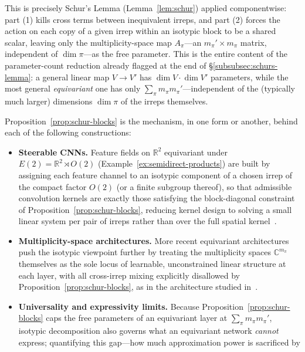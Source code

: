 \documentclass[mathematics,review,submit,moreauthors]{Definitions/mdpi}
\begin{document}
This is precisely Schur's Lemma (Lemma~\ref{lem:schur}) applied
componentwise: part (1) kills cross terms between inequivalent irreps, and
part (2) forces the action on each copy of a given irrep within an isotypic
block to be a shared scalar, leaving only the multiplicity-space map
$A_\pi$---an $m_\pi' \times m_\pi$ matrix, independent of $\dim \pi$---as the
free parameter. This is the entire content of the parameter-count reduction
already flagged at the end of \S\ref{subsubsec:schurs-lemma}: a general
linear map $V \to V'$ has $\dim V \cdot \dim V'$ parameters, while the most
general \emph{equivariant} one has only
$\sum_\pi m_\pi m_\pi'$---independent of the (typically much larger)
dimensions $\dim \pi$ of the irreps themselves.

\begin{Example}
\label{ex:isotypic-architecture}
Proposition~\ref{prop:schur-blocks} is the mechanism, in one form or
another, behind each of the following constructions:
\begin{itemize}
    \item \textbf{Steerable CNNs.} Feature fields on $\mathbb{R}^2$
    equivariant under $E(2) = \mathbb{R}^2 \rtimes O(2)$
    (Example~\ref{ex:semidirect-products}) are built by assigning each
    feature channel to an isotypic component of a chosen irrep of the
    compact factor $O(2)$ (or a finite subgroup thereof), so that admissible
    convolution kernels are exactly those satisfying the block-diagonal
    constraint of Proposition~\ref{prop:schur-blocks}, reducing kernel
    design to solving a small linear system per pair of irreps rather than
    over the full spatial kernel~\cite{weiler2019anips}.
    \item \textbf{Multiplicity-space architectures.} More recent
    equivariant architectures push the isotypic viewpoint further by
    treating the multiplicity spaces $\mathbb{C}^{m_\pi}$ themselves as the
    sole locus of learnable, unconstrained linear structure at each layer,
    with all cross-irrep mixing explicitly disallowed by
    Proposition~\ref{prop:schur-blocks}, as in the architecture studied
    in~\cite{xu2022p3icml}.
    \item \textbf{Universality and expressivity limits.} Because
    Proposition~\ref{prop:schur-blocks} caps the free parameters of an
    equivariant layer at $\sum_\pi m_\pi m_\pi'$, isotypic decomposition
    also governs what an equivariant network \emph{cannot} express;
    quantifying this gap---how much approximation power is sacrificed by

\end{itemize}
\end{Example}
\end{document}
